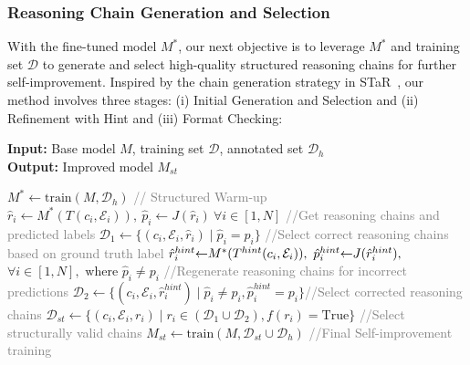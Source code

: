 \subsubsection{Reasoning Chain Generation and Selection}
With the fine-tuned model $M^*$, our next objective is to leverage $M^*$ and training set $\mathcal{D}$ to generate and select high-quality structured reasoning chains for further self-improvement. Inspired by the chain generation strategy in STaR~\cite{zelikman2022star}, our method involves three stages: (i) Initial Generation and Selection and (ii) Refinement with Hint and (iii) Format Checking:


\begin{algorithm}[t]
\caption{\themodel}
\label{alg:STRIVE}
\textbf{Input:} Base model $M$, training set $\mathcal{D}$, annotated set $\mathcal{D}_h$\\
\textbf{Output:} Improved model $M_{st}$

\begin{algorithmic}[1]
\STATE $M^* \gets \text{train}(M,\mathcal{D}_h)$  \textcolor{gray}{// Structured Warm-up}
\STATE $\hat{r}_i \gets M^*(T(c_i, \mathcal{E}_i)),\ \hat{p}_i \gets J(\hat{r}_i)\ \forall i \in [1, N]$  \textcolor{gray}{//Get reasoning chains and predicted labels}
\STATE $\mathcal{D}_1 \gets \{(c_i, \mathcal{E}_i, \hat{r}_i) \mid \hat{p}_i = p_i \}$ \textcolor{gray}{//Select correct reasoning chains based on ground truth label}
\STATE  $\hat{r}_i^{hint} \hspace{-1mm}\gets \hspace{-1mm} M^*(T^{hint}(c_i,\mathcal{E}_i)),\ \hat{p}_i^{hint}\hspace{-1mm} \gets \hspace{-1mm} J(\hat{r}_i^{hint}),$\\ $\forall i\in[1,N],\text{ where }\hat{p}_i \neq p_i$ \textcolor{gray}{//Regenerate reasoning chains for incorrect predictions}
\STATE $\mathcal{D}_2 \gets \{(c_i, \mathcal{E}_i, \hat{r}_i^{hint}) \mid \hat p_i\neq p_i,\hat{p}_i^{hint} = p_i \}$\textcolor{gray}{//Select corrected reasoning chains}
\STATE $\mathcal{D}_{st} \gets \{(c_i, \mathcal{E}_i, r_i) \mid r_i \in (\mathcal{D}_1 \cup \mathcal{D}_2), f(r_i) = \text{True}\}$ \textcolor{gray}{//Select structurally valid chains}
\STATE $M_{st}\gets \text{train}(M,\mathcal{D}_{st}\cup\mathcal{D}_h)$ \textcolor{gray}{//Final Self-improvement training}
\end{algorithmic}
\end{algorithm}


